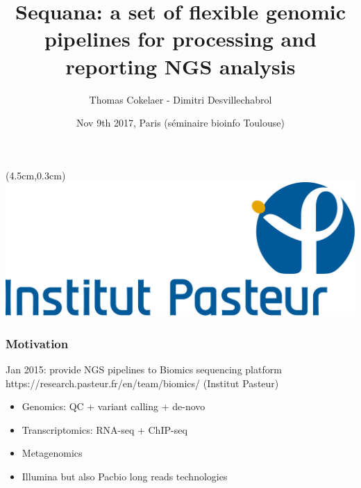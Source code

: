 \documentclass{beamer}
\title[Sequana]{Sequana: a set of flexible genomic pipelines for processing 
and reporting NGS analysis}
\author[T. Cokelaer]{Thomas Cokelaer - Dimitri Desvillechabrol}
\institute{Institut Pasteur}
\date{Nov 9th 2017, Paris (séminaire bioinfo Toulouse)}
\begin{document}

\begin{frame}[plain]
    \titlepage
    \begin{textblock*}{5cm}(4.5cm,0.3cm)
        \includegraphics[scale=0.09]{images/Institut_Pasteur.png}
    \end{textblock*}
\end{frame}





\begin{frame}
\frametitle{Motivation}
\begin{block}{Jan 2015: provide NGS pipelines to Biomics sequencing platform 
https://research.pasteur.fr/en/team/biomics/ (Institut Pasteur)}
 \begin{itemize}
  \item Genomics: QC + variant calling + de-novo
  \item Transcriptomics: RNA-seq + ChIP-seq 
  \item Metagenomics
  \item Illumina but also Pacbio long reads technologies
 \end{itemize}
\end{block} 
\end{frame}
\end{document}
